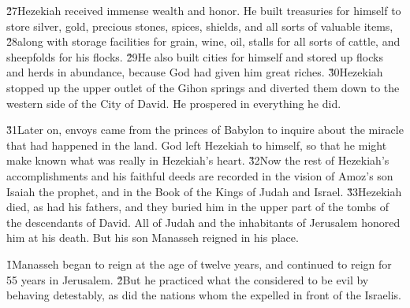 \v{27}Hezekiah received immense wealth and honor. He built treasuries for himself to store silver, gold, precious stones, spices, shields, and all sorts of valuable items, \v{28}along with storage facilities for grain, wine, oil, stalls for all sorts of cattle, and sheepfolds for his flocks. \v{29}He also built cities for himself and stored up flocks and herds in abundance, because God had given him great riches. \v{30}Hezekiah stopped up the upper outlet of the Gihon springs and diverted them down to the western side of the City of David. He prospered in everything he did.

\v{31}Later on, envoys came from the princes of Babylon to inquire about the miracle that had happened in the land. God left Hezekiah to himself, so that he might make known what was really in Hezekiah's heart. \v{32}Now the rest of Hezekiah's accomplishments and his faithful deeds are recorded in the vision of Amoz's son Isaiah the prophet, and in the Book of the Kings of Judah and Israel. \v{33}Hezekiah died, as had his fathers, and they buried him in the upper part of the tombs of the descendants of David. All of Judah and the inhabitants of Jerusalem honored him at his death. But his son Manasseh reigned in his place.

\v{1}Manasseh began to reign at the age of twelve years, and continued to reign for 55 years in Jerusalem. \v{2}But he practiced what the  considered to be evil by behaving detestably, as did the nations whom the  expelled in front of the Israelis.


